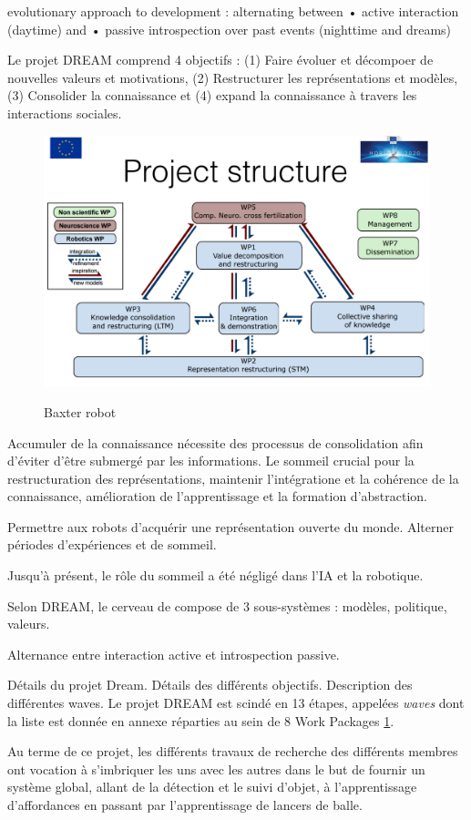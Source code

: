 \documentclass{llncs}
\begin{document}
evolutionary approach to
development : alternating between
• active interaction (daytime) and
• passive introspection over past
events (nighttime and dreams)

Le projet DREAM comprend 4 objectifs : (1) Faire évoluer et décompoer de nouvelles valeurs et motivations, (2) Restructurer les représentations et modèles, (3) Consolider la connaissance et (4) expand la connaissance à travers les interactions sociales.

\begin{figure}
	\centering
	\includegraphics[width=.7\textwidth]{figures/project_structure.png}
	\label{fig:dream}
	\caption{Baxter robot}
\end{figure}

Accumuler de la connaissance nécessite des processus de consolidation afin d'éviter d'être submergé par les informations. Le sommeil crucial pour la restructuration des représentations, maintenir l'intégratione et la cohérence de la connaissance, amélioration de l'apprentissage et la formation d'abstraction.

Permettre aux robots d'acquérir une représentation ouverte du monde. Alterner périodes d'expériences et de sommeil.

Jusqu'à présent, le rôle du sommeil a été négligé dans l'IA et la robotique.

Selon DREAM, le cerveau de compose de 3 sous-systèmes : modèles, politique, valeurs.

Alternance entre interaction active et introspection passive.

Détails du projet Dream.
Détails des différents objectifs.
Description des différentes waves.
Le projet DREAM est scindé en 13 étapes, appelées \textit{waves} dont la liste est donnée en annexe réparties au sein de 8 Work Packages \ref{fig:dream}.

Au terme de ce projet, les différents travaux de recherche des différents membres ont vocation à s'imbriquer les uns avec les autres dans le but de fournir un système global, allant de la détection et le suivi d'objet, à l'apprentissage d'affordances en passant par l'apprentissage de lancers de balle.
\end{document}
